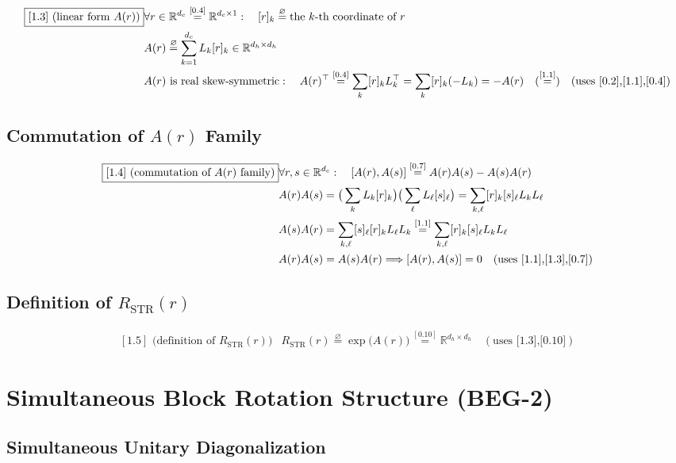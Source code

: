 \documentclass[11pt]{article}
\newcommand{\eqdef}{\overset{\varnothing}{=}}
\newcommand{\eqref}[1]{\overset{[#1]}{=}}
\begin{document}
\begin{align}
\boxed{[1.3] \text{ (linear form }A(r)\text{)}}
&\forall r
\in
\mathbb{R}^{d_c}
\eqref{0.4}
\mathbb{R}^{d_c\times 1}
:\quad
[r]_k
\eqdef
\text{the }k\text{-th coordinate of }r \notag\\
&A(r)
\eqdef
\sum_{k=1}^{d_c}
L_k
[r]_k
\in
\mathbb{R}^{d_h\times d_h} \notag\\
&A(r)
\text{ is real skew-symmetric}:
\quad
A(r)^\top
\eqref{0.4}
\sum_k
[r]_k
L_k^\top
=
\sum_k
[r]_k
(-L_k)
=
-A(r)
\quad(\eqref{1.1})
\quad(\text{uses [0.2],[1.1],[0.4]})
\end{align}

\subsection{Commutation of $A(r)$ Family}

\begin{align}
\boxed{[1.4] \text{ (commutation of }A(r)\text{ family)}}
&\forall r,s\in\mathbb{R}^{d_c}:\quad
[A(r),A(s)]
\eqref{0.7}
A(r)A(s) - A(s)A(r) \notag\\
&A(r)A(s)
=
\big(\sum_k L_k [r]_k\big)
\big(\sum_\ell L_\ell [s]_\ell\big)
=
\sum_{k,\ell}
[r]_k [s]_\ell
L_k L_\ell \notag\\
&A(s)A(r)
=
\sum_{k,\ell}
[s]_\ell [r]_k
L_\ell L_k
\eqref{1.1}
\sum_{k,\ell}
[r]_k [s]_\ell
L_k L_\ell \notag\\
&A(r)A(s)
=
A(s)A(r)
\Longrightarrow
[A(r),A(s)]=0
\quad(\text{uses [1.1],[1.3],[0.7]})
\end{align}

\subsection{Definition of $R_{\mathrm{STR}}(r)$}

\begin{align}
\boxed{[1.5] \text{ (definition of }R_{\mathrm{STR}}(r)\text{)}}
&R_{\mathrm{STR}}(r)
\eqdef
\exp\big(A(r)\big)
\eqref{0.10}
\mathbb{R}^{d_h\times d_h}
\quad(\text{uses [1.3],[0.10]})
\end{align}

\section{Simultaneous Block Rotation Structure (BEG-2)}

\subsection{Simultaneous Unitary Diagonalization}
\end{document}

